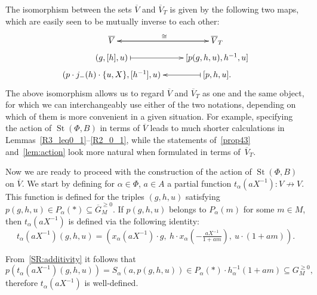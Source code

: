 \documentclass[oneside, 8pt]{amsart}
\theoremstyle{remark}
\theoremstyle{definition}
\numberwithin{lemma}{section}
\numberwithin{prop}{section}
\numberwithin{corollary}{section}
\numberwithin{externaltheorem}{section}
\DeclareMathOperator{\St}{St}
\numberwithin{equation}{section}
\begin{document}
The isomorphism between the sets $\overline{V}$ and $\overline{V}_T$ is given by the following two maps, which are easily seen to be mutually inverse to each other:
\begin{equation} \label{eq:VVT} \xymatrix @R0.3pc {\overline{V} \ar[r]^{\cong} & \ar[l] \overline{V}_T \\ (g, [h], u) \ar@{|->}[r] & [p(g, h, u), h^{-1}, u] \\ (p \cdot j_-(h) \cdot \{u, X\}, [h^{-1}], u) & \ar@{|->}[l] [p, h, u]. } \end{equation}
The above isomorphism allows us to regard $\overline{V}$ and $\overline{V}_T$ as one and the same object, for which we can interchangeably use either of the two notations,
 depending on which of them is more convenient in a given situation.
For example, specifying the action of $\St(\Phi, B)$ in terms of $\overline{V}$ leads to much shorter calculations in Lemmas~\ref{R3_leq0_1}--\ref{R2_0_1},
 while the statements of~\cref{prop43} and~\cref{lem:action} look more natural when formulated in terms of~$\overline{V}_T$.

Now we are ready to proceed with the construction of the action of $\St(\Phi, B)$ on $\overline{V}$. We start by defining for $\alpha \in \Phi$, $a \in A$ a partial function $t_\alpha(aX^{-1}) \colon V \not\to V$.
This function is defined for the triples $(g, h, u)$ satisfying $p(g, h, u) \in P_\alpha(*) \subseteq \overline{G}_M^{\geq 0}$.
If $p(g, h, u)$ belongs to $P_\alpha(m)$ for some $m \in M$, then $t_\alpha(aX^{-1})$ is defined via the following identity:
\begin{equation} \label{T_1} t_\alpha(aX^{-1}) (g, h, u) = \left( x_\alpha(aX^{-1})\cdot g ,\ h \cdot x_\alpha\left(-\tfrac{aX^{-1}}{1 + am}\right),\ u \cdot (1 + am)\right).\end{equation}

From~\cref{SR:additivity} it follows that
\[p\left(t_\alpha(aX^{-1}) (g, h, u)\right) = S_\alpha(a, p(g, h, u)) \in P_\alpha(*) \cdot h_{\alpha}^{-1}(1+am) \subseteq G_M^{\geq 0},\]
therefore $t_\alpha(aX^{-1})$ is well-defined.
\end{document}
